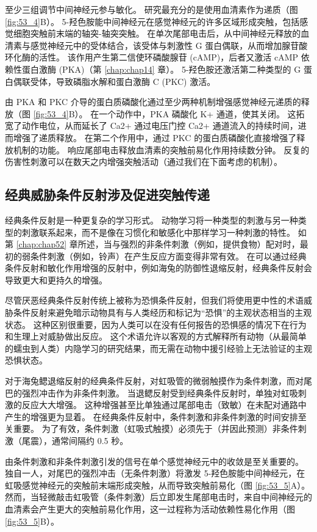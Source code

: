 至少三组调节中间神经元参与敏化。 研究最充分的是使用血清素作为递质（图 \ref{fig:53_4}B）。 5-羟色胺能中间神经元在感觉神经元的许多区域形成突触，包括感觉细胞突触前末端的轴突-轴突突触。 在单次尾部电击后，从中间神经元释放的血清素与感觉神经元中的受体结合，该受体与刺激性 G 蛋白偶联，从而增加腺苷酸环化酶的活性。 该作用产生第二信使环磷酸腺苷 (cAMP)，后者又激活 cAMP 依赖性蛋白激酶 (PKA)（第 \ref{chap:chap14} 章）。 5-羟色胺还激活第二种类型的 G 蛋白偶联受体，导致磷脂水解和蛋白激酶 C (PKC) 激活。

由 PKA 和 PKC 介导的蛋白质磷酸化通过至少两种机制增强感觉神经元递质的释放（图 \ref{fig:53_4}B）。 在一个动作中，PKA 磷酸化 K+ 通道，使其关闭。 这拓宽了动作电位，从而延长了 Ca2+ 通过电压门控 Ca2+ 通道流入的持续时间，进而增强了递质释放。 在第二个作用中，通过 PKC 的蛋白质磷酸化直接增强了释放机制的功能。 响应尾部电击释放血清素的突触前易化作用持续数分钟。 反复的伤害性刺激可以在数天之内增强突触活动（通过我们在下面考虑的机制）。

\subsection{经典威胁条件反射涉及促进突触传递}
经典条件反射是一种更复杂的学习形式。 动物学习将一种类型的刺激与另一种类型的刺激联系起来，而不是像在习惯化和敏感化中那样学习一种刺激的特性。 如第 \ref{chap:chap52} 章所述，当与强烈的非条件刺激（例如，提供食物）配对时，最初的弱条件刺激（例如，铃声）在产生反应方面变得非常有效。 在可以通过经典条件反射和敏化作用增强的反射中，例如海兔的防御性退缩反射，经典条件反射会导致更大和更持久的增强。

尽管厌恶经典条件反射传统上被称为恐惧条件反射，但我们将使用更中性的术语威胁条件反射来避免暗示动物具有与人类经历和标记为“恐惧”的主观状态相当的主观状态。 这种区别很重要，因为人类可以在没有任何报告的恐惧感的情况下在行为和生理上对威胁做出反应。 这个术语允许以客观的方式解释所有动物（从最简单的蠕虫到人类）内隐学习的研究结果，而无需在动物中援引经验上无法验证的主观恐惧状态。

对于海兔鳃退缩反射的经典条件反射，对虹吸管的微弱触摸作为条件刺激，而对尾巴的强烈冲击作为非条件刺激。 当退鳃反射受到经典条件反射时，单独对虹吸刺激的反应大大增强。 这种增强甚至比单独通过尾部电击（致敏）在未配对通路中产生的增强更为显着。 在经典条件反射中，条件刺激和非条件刺激的时间安排至关重要。 为了有效，条件刺激（虹吸式触摸）必须先于（并因此预测）非条件刺激（尾震），通常间隔约 0.5 秒。

由条件刺激和非条件刺激引发的信号在单个感觉神经元中的收敛是至关重要的。 独自一人，对尾巴的强烈冲击（无条件刺激）将激发 5-羟色胺能中间神经元，在虹吸感觉神经元的突触前末端形成突触，从而导致突触前易化（图 \ref{fig:53_5}A）。 然而，当轻微敲击虹吸管（条件刺激）后立即发生尾部电击时，来自中间神经元的血清素会产生更大的突触前易化作用，这一过程称为活动依赖性易化作用（图 \ref{fig:53_5}B）。

